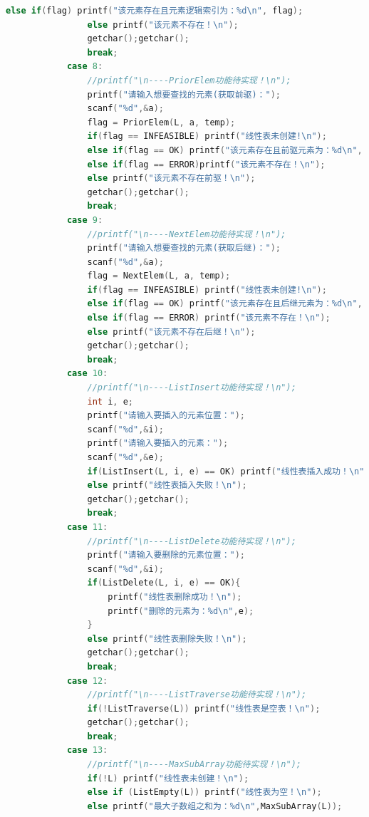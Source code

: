 \documentclass[supercite]{Experimental_Report}
\theoremstyle{definition}
\begin{document}
\begin{lstlisting}[language=c]
                else if(flag) printf("该元素存在且元素逻辑索引为：%d\n", flag);
                else printf("该元素不存在！\n");
                getchar();getchar();
                break;
            case 8:
                //printf("\n----PriorElem功能待实现！\n");
                printf("请输入想要查找的元素(获取前驱)：");
                scanf("%d",&a);
                flag = PriorElem(L, a, temp);
                if(flag == INFEASIBLE) printf("线性表未创建!\n");
                else if(flag == OK) printf("该元素存在且前驱元素为：%d\n", temp);
                else if(flag == ERROR)printf("该元素不存在！\n");
                else printf("该元素不存在前驱！\n");
                getchar();getchar();
                break;
            case 9:
                //printf("\n----NextElem功能待实现！\n");
                printf("请输入想要查找的元素(获取后继)：");
                scanf("%d",&a);
                flag = NextElem(L, a, temp);
                if(flag == INFEASIBLE) printf("线性表未创建!\n");
                else if(flag == OK) printf("该元素存在且后继元素为：%d\n", temp);
                else if(flag == ERROR) printf("该元素不存在！\n");
                else printf("该元素不存在后继！\n");
                getchar();getchar();
                break;
            case 10:
                //printf("\n----ListInsert功能待实现！\n");
                int i, e;
                printf("请输入要插入的元素位置：");
                scanf("%d",&i);
                printf("请输入要插入的元素：");
                scanf("%d",&e);
                if(ListInsert(L, i, e) == OK) printf("线性表插入成功！\n");
                else printf("线性表插入失败！\n");
                getchar();getchar();
                break;
            case 11:
                //printf("\n----ListDelete功能待实现！\n");
                printf("请输入要删除的元素位置：");
                scanf("%d",&i);
                if(ListDelete(L, i, e) == OK){
                    printf("线性表删除成功！\n");
                    printf("删除的元素为：%d\n",e);
                }
                else printf("线性表删除失败！\n");
                getchar();getchar();
                break;
            case 12:
                //printf("\n----ListTraverse功能待实现！\n");
                if(!ListTraverse(L)) printf("线性表是空表！\n");
                getchar();getchar();
                break;
            case 13:
                //printf("\n----MaxSubArray功能待实现！\n");
                if(!L) printf("线性表未创建！\n");
                else if (ListEmpty(L)) printf("线性表为空！\n");
                else printf("最大子数组之和为：%d\n",MaxSubArray(L));

\end{lstlisting}
\end{document}
